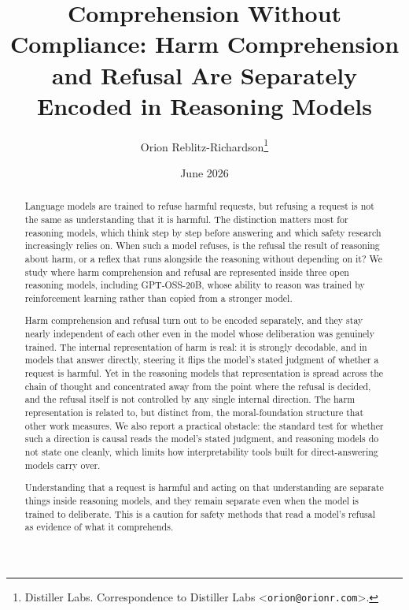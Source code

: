 \documentclass{article}
\title{Comprehension Without Compliance: Harm Comprehension and Refusal Are
Separately Encoded in Reasoning Models}
\author{%
  Orion Reblitz-Richardson\thanks{%
    Distiller Labs. Correspondence to Distiller Labs
    \textless\texttt{orion@orionr.com}\textgreater.}
}
\date{June 2026}
\begin{document}
\maketitle

\begin{abstract}
Language models are trained to refuse harmful requests, but refusing a request is
not the same as understanding that it is harmful. The distinction matters most for
reasoning models, which think step by step before answering and which safety
research increasingly relies on. When such a model refuses, is the refusal the
result of reasoning about harm, or a reflex that runs alongside the reasoning
without depending on it? We study where harm comprehension and refusal are
represented inside three open reasoning models, including GPT-OSS-20B, whose ability
to reason was trained by reinforcement learning rather than copied from a stronger
model.

Harm comprehension and refusal turn out to be encoded separately, and they stay
nearly independent of each other even in the model whose deliberation was genuinely
trained. The internal representation of harm is real: it is strongly decodable, and
in models that answer directly, steering it flips the model's stated judgment of
whether a request is harmful. Yet in the reasoning models that representation is
spread across the chain of thought and concentrated away from the point where the
refusal is decided, and the refusal itself is not controlled by any single internal
direction. The harm representation is related to, but distinct from, the
moral-foundation structure that other work measures. We also report a practical
obstacle: the standard test for whether such a direction is causal reads the model's
stated judgment, and reasoning models do not state one cleanly, which limits how
interpretability tools built for direct-answering models carry over.

Understanding that a request is harmful and acting on that understanding are separate
things inside reasoning models, and they remain separate even when the model is
trained to deliberate. This is a caution for safety methods that read a model's
refusal as evidence of what it comprehends.
\end{abstract}







\end{document}
